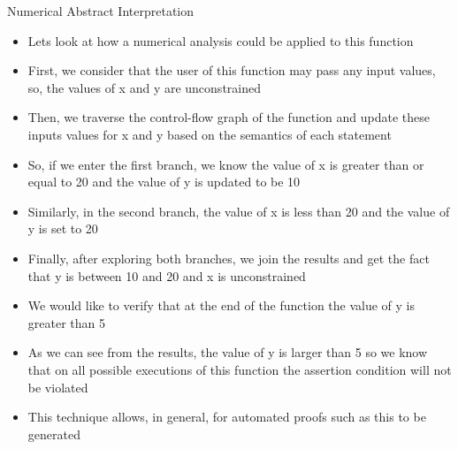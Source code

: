 \documentclass[t]{beamer}
\begin{document}
\begin{frame}[fragile]{Numerical Abstract Interpretation}
{\begin{itemize}
        interpretation is to reason about the numerical properties of a program
      \item Lets look at how a numerical analysis could be applied to this
        function
      \item First, we consider that the user of this function may pass any
        input values, so, the values of x and y are unconstrained
      \item Then, we traverse the control-flow graph of the function and update
        these inputs values for x and y based on the semantics of each
        statement
      \item So, if we enter the first branch, we know the value of x is greater
        than or equal to 20 and the value of y is updated to be 10
      \item Similarly, in the second branch, the value of x is less than 20 and
        the value of y is set to 20
      \item Finally, after exploring both branches, we join the results and get
        the fact that y is between 10 and 20 and x is unconstrained
      \item We would like to verify that at the end of the
        function the value of y is greater than 5
      \item As we can see from the results, the value of y is larger than 5 so
        we know that on all possible executions of this function the assertion
        condition will not be violated
      \item This technique allows, in general, for automated proofs such as
        this to be generated
    \end{itemize}
  }
\end{frame}
\end{document}

